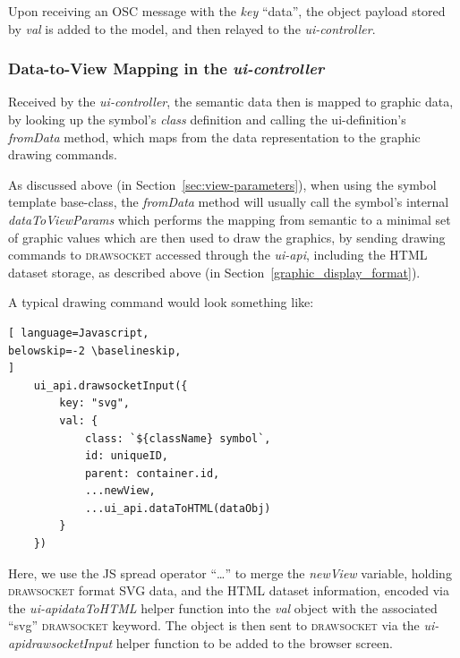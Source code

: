 \documentclass{article}
\def\drawsocket{\textsc{drawsocket}\xspace}
\def\uicontroller{\textit{ui-controller}\xspace}
\def\uiapi{\textit{ui-api}\xspace}
\begin{document}
Upon receiving an OSC message with the \textit{key} ``data'', the object payload stored by \textit{val} is added to the model, and then relayed to the \uicontroller.


\subsubsection*{Data-to-View Mapping in the \uicontroller}

Received by the \uicontroller, the semantic data then is mapped to graphic data, by looking up the symbol's \textit{class} definition and calling the ui-definition's \textit{fromData} method, which maps from the data representation to the graphic drawing commands. 

As discussed above (in Section~\ref{sec:view-parameters}), when using the symbol template base-class, the \textit{fromData} method will usually call the symbol's internal \textit{dataToViewParams} which performs the mapping from semantic to a minimal set of graphic values which are then used to draw the graphics, by sending drawing commands to \drawsocket accessed through the \uiapi, including the HTML dataset storage, as described above (in Section~\ref{graphic_display_format}).

A typical drawing command would look something like:

\begin{lstlisting}[ language=Javascript,
belowskip=-2 \baselineskip,
]
    ui_api.drawsocketInput({
        key: "svg",
        val: {
            class: `${className} symbol`,
            id: uniqueID,
            parent: container.id,
            ...newView, 
            ...ui_api.dataToHTML(dataObj)
        }
    }) 
\end{lstlisting}

\noindent
Here, we use the JS spread operator ``\ldots'' to merge the \textit{newView} variable, holding \drawsocket format SVG data, and the HTML dataset information, encoded via the \uiapi \textit{dataToHTML} helper function into the \textit{val} object with the associated ``svg'' \drawsocket keyword. The object is then sent to \drawsocket via the \uiapi \textit{drawsocketInput} helper function to be added to the browser screen.
\end{document}
